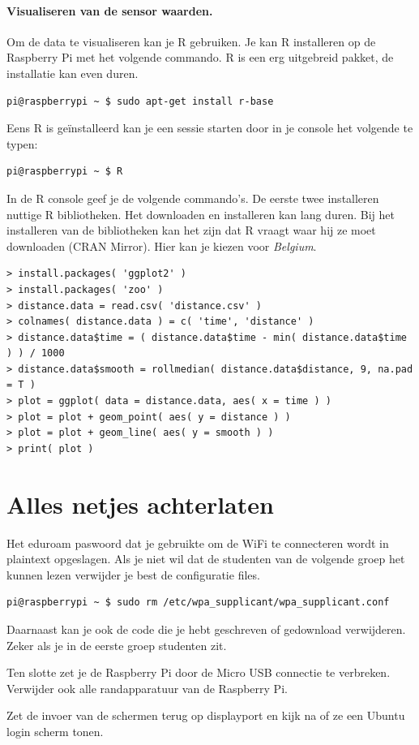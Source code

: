 \documentclass[a4paper]{article}
\begin{document}
  
  \paragraph{Visualiseren van de sensor waarden.}  Om de data te
visualiseren kan je R gebruiken.  Je kan R installeren op de Raspberry
Pi met het volgende commando.  R is een erg uitgebreid pakket, de
installatie kan even duren.
\begin{lstlisting}
pi@raspberrypi ~ $ sudo apt-get install r-base
\end{lstlisting}

  Eens R is ge\"installeerd kan je een sessie starten door in je
console het volgende te typen:
\begin{lstlisting}
pi@raspberrypi ~ $ R
\end{lstlisting}

  In de R console geef je de volgende commando's.  De eerste twee
installeren nuttige R bibliotheken.  Het downloaden en installeren kan
lang duren.  Bij het installeren van de bibliotheken kan het zijn dat
R vraagt waar hij ze moet downloaden (CRAN Mirror).  Hier kan je
kiezen voor \emph{Belgium}.
\begin{lstlisting}
> install.packages( 'ggplot2' )
> install.packages( 'zoo' )
> distance.data = read.csv( 'distance.csv' )
> colnames( distance.data ) = c( 'time', 'distance' )
> distance.data$time = ( distance.data$time - min( distance.data$time ) ) / 1000
> distance.data$smooth = rollmedian( distance.data$distance, 9, na.pad = T )
> plot = ggplot( data = distance.data, aes( x = time ) )
> plot = plot + geom_point( aes( y = distance ) )
> plot = plot + geom_line( aes( y = smooth ) )
> print( plot )
\end{lstlisting}

\section{Alles netjes achterlaten}\label{sec:opruimen}

Het eduroam paswoord dat je gebruikte om de WiFi te connecteren wordt
in plaintext opgeslagen.  Als je niet wil dat de studenten van de
volgende groep het kunnen lezen verwijder je best de configuratie
files.

\begin{lstlisting}
pi@raspberrypi ~ $ sudo rm /etc/wpa_supplicant/wpa_supplicant.conf
\end{lstlisting}

Daarnaast kan je ook de code die je hebt geschreven of gedownload
verwijderen.  Zeker als je in de eerste groep studenten zit.

Ten slotte zet je de Raspberry Pi door de Micro USB connectie te
verbreken.  Verwijder ook alle randapparatuur van de Raspberry Pi.

Zet de invoer van de schermen terug op displayport en kijk na of ze
een Ubuntu login scherm tonen.
\end{document}
